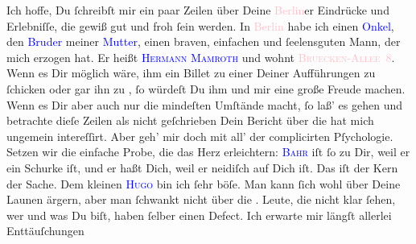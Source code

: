            \pstart
           Ich hoffe, Du ſchreibſt mir ein paar Zeilen über Deine \textcolor{pink}{Berlin}{}\ledrightnote{\textcolor{pink}{Berlin}}er Eindrücke und Erlebniſſe, die gewiß gut und froh ſein werden. In
                  \textcolor{pink}{Berlin}{}\ledrightnote{\textcolor{pink}{Berlin}} habe ich einen \textcolor{blue}{Onkel}{}, den \textcolor{blue}{Bruder}{} meiner \textcolor{blue}{Mutter}{}, einen braven, einfachen und  ſeelensguten {\pb}Mann\strikeout{\textcolor{gray}{e}}, der mich erzogen hat. Er heißt \textsc{\textcolor{blue}{Hermann Mamroth}{}\ledrightnote{\textcolor{blue}{Hermann Mamroth}}} und wohnt \textcolor{pink}{\textsc{Bruecken-Allee} 8}{}\ledrightnote{\textcolor{pink}{Bartningallee}}. Wenn es Dir möglich wäre, ihm ein
               Billet zu einer Deiner Aufführungen zu ſchicken oder gar ihn zu \label{K_L02766-7v}\label{K_L02766-7h}, ſo würdeſt  Du ihm und mir eine große Freude machen. Wenn es Dir aber auch nur die
               mindeſten Umſtände macht, ſo laß’  es gehen {\pb}und betrachte dieſe Zeilen als nicht geſchrieben{\dotsfive}\pend
           \pstart
           Dein Bericht über die \label{K_L02766-5v}\label{K_L02766-5h} hat mich ungemein intereſſirt. Aber geh’ mir doch mit all’ der complicirten
               Pſychologie. Setzen wir die einfache Probe, die das Herz erleichtern: \textsc{\textcolor{blue}{Bahr}{}\ledrightnote{\textcolor{blue}{Hermann Bahr}}} iſt ſo zu Dir,  weil er ein Schurke iſt,
               und er haßt Dich, weil er neidiſch auf Dich iſt. Das iſt der Kern der Sache. Dem
               kleinen {\pb}\textsc{\textcolor{blue}{Hugo}{}\ledrightnote{\textcolor{blue}{Hugo von Hofmannsthal}}} bin ich ſehr böſe. Man kann ſich wohl über Deine  Launen ärgern, aber man ſchwankt nicht über die \label{K_L02766-6v}\label{K_L02766-6h}. Leute, die nicht klar ſehen, wer und was Du biſt, haben ſelber einen Defect.
               Ich erwarte mir längſt allerlei Enttäuſchungen 
